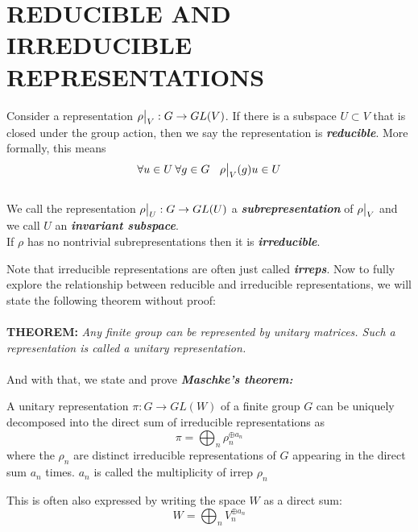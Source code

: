 \documentclass[9 pt]{report}
\begin{document}
{\centering
\section*{REDUCIBLE AND IRREDUCIBLE REPRESENTATIONS}}
\begin{tcolorbox}
Consider a representation $\rho\big{|}_V : G\rightarrow GL(V)$. If there is a subspace $U \subset V$ that is closed under the group action, then we say the representation is \textbf{\textit{reducible}}. More formally, this means
\\
 $$\forall u\in U \:\forall g\in G \:\:\:\:\rho\big{|}_V(g)u \in U$$
\\
We call the representation $\rho\big{|}_U : G\rightarrow GL(U)$ a \textbf{\textit{subrepresentation}} of $\rho\big{|}_V$ and we call $U$ an \textbf{\emph{invariant subspace}}.
\\
If $\rho$ has no nontrivial subrepresentations then it is \textbf{\textit{irreducible}}.
\end{tcolorbox}
Note that irreducible representations are often just called \textbf{\emph{irreps}}. Now to fully explore the relationship between reducible and irreducible representations, we will state the following theorem without proof:
\\
\\
\textbf{THEOREM:} \emph{Any finite group can be represented by unitary matrices. Such a representation is called a unitary representation.}
\\
\\
And with that, we state and prove \textbf{\emph{Maschke's theorem:}}

\begin{tcolorbox}
	A unitary representation $\pi: G \to GL(W)$ of a finite group $G$ can be uniquely decomposed into the direct sum of irreducible representations as
	$$ \pi = \bigoplus_{n}\rho_n^{\oplus a_n} $$
	where the $\rho_n$ are distinct irreducible representations of $G$ appearing in the direct sum $a_n$ times. $a_n$ is called the multiplicity of irrep $\rho_n$
\end{tcolorbox}
This is often also expressed by writing the space $W$ as a direct sum:
$$ W = \bigoplus_n V_n^{\oplus a_n} $$
\end{document}
